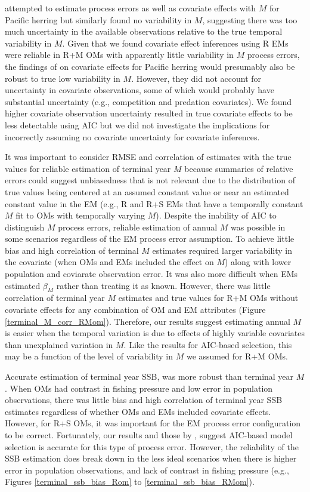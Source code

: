 \documentclass[
  12pt,
]{article}
\begin{document}
\citet{derisoetal08} attempted to estimate process errors as well as covariate effects with \(M\) for Pacific herring but similarly found no variability in \(M\), suggesting there was too much uncertainty in the available observations relative to the true temporal variability in \(M\). Given that we found covariate effect inferences using R EMs were reliable in R+M OMs with apparently little variability in \(M\) process errors, the findings of \citet{derisoetal08} on covariate effects for Pacific herring would presumably also be robust to true low variability in \(M\). However, they did not account for uncertainty in covariate observations, some of which would probably have substantial uncertainty (e.g., competition and predation covariates). We found higher covariate observation uncertainty resulted in true covariate effects to be less detectable using AIC but we did not investigate the implications for incorrectly assuming no covariate uncertainty for covariate inferences.

It was important to consider RMSE and correlation of estimates with the true values for reliable estimation of terminal year \(M\) because summaries of relative errors could suggest unbiasedness that is not relevant due to the distribution of true values being centered at an assumed constant value or near an estimated constant value in the EM (e.g., R and R+S EMs that have a temporally constant \(M\) fit to OMs with temporally varying \(M\)). Despite the inability of AIC to distinguish \(M\) process errors, reliable estimation of annual \(M\) was possible in some scenarios regardless of the EM process error assumption. To achieve little bias and high correlation of terminal \(M\) estimates required larger variability in the covariate (when OMs and EMs included the effect on \(M\)) along with lower population and coviarate observation error. It was also more difficult when EMs estimated \(\beta_M\) rather than treating it as known. However, there was little correlation of terminal year \(M\) estimates and true values for R+M OMs without covariate effects for any combination of OM and EM attributes (Figure \ref{terminal_M_corr_RMom}). Therefore, our results suggest estimating annual \(M\) is easier when the temporal variation is due to effects of highly variable covariates than unexplained variation in \(M\). Like the results for AIC-based selection, this may be a function of the level of variability in \(M\) we assumed for R+M OMs.

Accurate estimation of terminal year SSB, was more robust than terminal year \(M\). When OMs had contrast in fishing pressure and low error in population observations, there was little bias and high correlation of terminal year SSB estimates regardless of whether OMs and EMs included covariate effects. However, for R+S OMs, it was important for the EM process error configuration to be correct. Fortunately, our results and those by \citet{milleretal_inreview1}, suggest AIC-based model selection is accurate for this type of process error. However, the reliability of the SSB estimation does break down in the less ideal scenarios when there is higher error in population observations, and lack of contrast in fishing pressure (e.g., Figures \ref{terminal_ssb_bias_Rom} to \ref{terminal_ssb_bias_RMom}).
\end{document}
